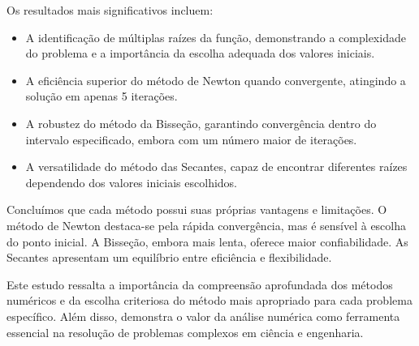 \documentclass{article}
\begin{document}
Os resultados mais significativos incluem:

\begin{itemize}
    \item A identificação de múltiplas raízes da função, demonstrando a complexidade do problema e a importância da escolha adequada dos valores iniciais.
    \item A eficiência superior do método de Newton quando convergente, atingindo a solução em apenas 5 iterações.
    \item A robustez do método da Bisseção, garantindo convergência dentro do intervalo especificado, embora com um número maior de iterações.
    \item A versatilidade do método das Secantes, capaz de encontrar diferentes raízes dependendo dos valores iniciais escolhidos.
\end{itemize}

Concluímos que cada método possui suas próprias vantagens e limitações. O método de Newton destaca-se pela rápida convergência, mas é sensível à escolha do ponto inicial. A Bisseção, embora mais lenta, oferece maior confiabilidade. As Secantes apresentam um equilíbrio entre eficiência e flexibilidade.

Este estudo ressalta a importância da compreensão aprofundada dos métodos numéricos e da escolha criteriosa do método mais apropriado para cada problema específico. Além disso, demonstra o valor da análise numérica como ferramenta essencial na resolução de problemas complexos em ciência e engenharia.
\end{document}
